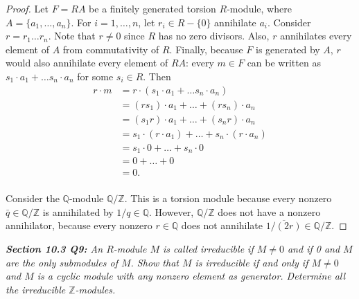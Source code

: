\documentclass{article}
\begin{document}
  \begin{proof}
    Let $F=RA$ be a finitely generated torsion $R$-module, where
    $A=\{a_1,\ldots,a_n\}$. For $i=1,\ldots,n$, let $r_i\in R-\{0\}$
    annihilate $a_i$. Consider $r=r_1\ldots r_n$. Note that $r\neq0$ since
    $R$ has no zero divisors. Also, $r$ annihilates every element of $A$
    from commutativity of $R$. Finally, because $F$ is generated by $A$,
    $r$ would also annihilate every element of $RA$: every $m\in F$ can be
    written as $s_1\cdot a_1+\ldots s_n\cdot a_n$ for some $s_i\in R$. Then
    \begin{align*}
      r\cdot m &=r\cdot(s_1\cdot a_1+\ldots s_n\cdot a_n)\\
      &=(rs_1)\cdot a_1 +\ldots +(rs_n)\cdot a_n\\
      &=(s_1r)\cdot a_1 +\ldots +(s_nr)\cdot a_n\\
      &=s_1\cdot(r\cdot a_1) +\ldots +s_n\cdot(r\cdot a_n)\\
      &=s_1\cdot0 +\ldots +s_n\cdot0\\
      &=0 +\ldots +0\\
      &=0.\\
    \end{align*}

    Consider the $\mathbb{Q}$-module $\mathbb{Q}/\mathbb{Z}$. This is a
    torsion module because every nonzero $\bar{q}\in\mathbb{Q}/\mathbb{Z}$
    is annihilated by $1/q\in\mathbb{Q}$. However, $\mathbb{Q}/\mathbb{Z}$
    does not have a nonzero annihilator, because every nonzero
    $r\in\mathbb{Q}$ does not annihilate
    $\overline{1/(2r)}\in\mathbb{Q}/\mathbb{Z}$.
  \end{proof}

\it \textbf{Section 10.3 Q9:} An $R$-module $M$ is called irreducible if
  $M\neq0$ and if 0 and $M$ are the only submodules of $M$. Show that $M$
  is irreducible if and only if $M\neq0$ and $M$ is a cyclic module with
  any nonzero element as generator. Determine all the irreducible
  $\mathbb{Z}$-modules.
\end{document}
